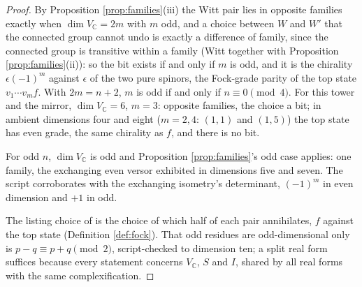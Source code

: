 \documentclass[11pt]{article}
\theoremstyle{definition}
\newcommand{\C}{\mathbb{C}}
\begin{document}
\begin{proof}
By Proposition \ref{prop:families}(iii) the Witt pair lies in opposite families exactly when $\dim V_{\C} = 2m$ with $m$ odd, and a choice between $W$ and $W'$ that the connected group cannot undo is exactly a difference of family, since the connected group is transitive within a family (Witt together with Proposition \ref{prop:families}(ii)): so the bit exists if and only if $m$ is odd, and it is the chirality $\epsilon(-1)^{m}$ against $\epsilon$ of the two pure spinors, the Fock-grade parity of the top state $v_{1}\cdots v_{m}f$. With $2m = n + 2$, $m$ is odd if and only if $n \equiv 0 \pmod 4$. For this tower and the mirror, $\dim V_{\C} = 6$, $m = 3$: opposite families, the choice a bit; in ambient dimensions four and eight ($m = 2, 4$: $(1,1)$ and $(1,5)$) the top state has even grade, the same chirality as $f$, and there is no bit.

For odd $n$, $\dim V_{\C}$ is odd and Proposition \ref{prop:families}'s odd case applies: one family, the exchanging even versor exhibited in dimensions five and seven. The script corroborates with the exchanging isometry's determinant, $(-1)^{m}$ in even dimension and $+1$ in odd.

The listing choice of \cite[Prop.~5.6]{ButlerT12} is the choice of which half of each pair annihilates, $f$ against the top state (Definition \ref{def:fock}). That odd residues are odd-dimensional only is $p - q \equiv p + q \pmod 2$, script-checked to dimension ten; a split real form suffices because every statement concerns $V_{\C}$, $S$ and $I$, shared by all real forms with the same complexification.
\end{proof}
\end{document}
